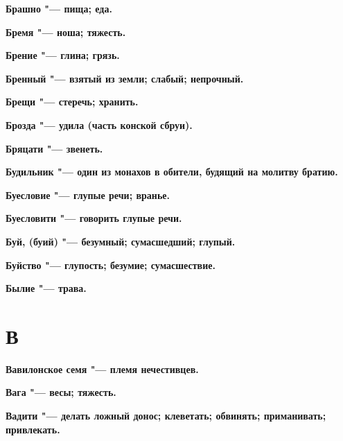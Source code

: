 \begin{mymulticols}{2}
\bfseries Брашно\normalfont{} "--- пища; еда. 




\bfseries Бремя\normalfont{} "--- ноша; тяжесть. 




\bfseries Брение\normalfont{} "--- глина; грязь. 




\bfseries Бренный\normalfont{} "--- взятый из земли; слабый; непрочный. 




\bfseries Брещи\normalfont{} "--- стеречь; хранить. 




\bfseries Брозда\normalfont{} "--- удила (часть конской сбруи). 




\bfseries Бряцати\normalfont{} "--- звенеть. 




\bfseries Будильник\normalfont{} "--- один из монахов в обители, будящий на молитву братию. 




\bfseries Буесловие\normalfont{} "--- глупые речи; вранье. 




\bfseries Буесловити\normalfont{} "--- говорить глупые речи. 




\bfseries Буй, (буий)\normalfont{} "--- безумный; сумасшедший; глупый. 




\bfseries Буйство\normalfont{} "--- глупость; безумие; сумасшествие. 




\bfseries Былие\normalfont{} "--- трава. 




\section{В} 





\bfseries Вавилонское семя\normalfont{} "--- племя нечестивцев. 




\bfseries Вага\normalfont{} "--- весы; тяжесть. 




\bfseries Вадити\normalfont{} "--- делать ложный донос; клеветать; обвинять; приманивать; привлекать. 





\end{mymulticols}

